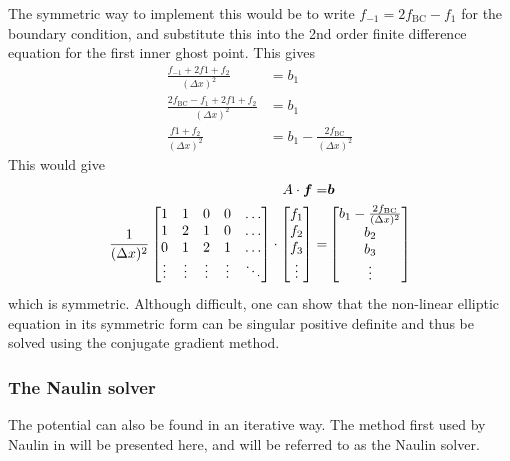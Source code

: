The symmetric way to implement this would be to write $f_{-1}=2f_{\text{BC}}-f_{1}$ for the boundary condition, and substitute this into the 2nd order finite difference equation for the first inner ghost point.
This gives
%
\begin{align*}
    \frac{f_{-1}+2f{1}+f_{2}}{(\Delta x)^2}&=b_1\\
    \frac{2f_{\text{BC}}-f_{1}+2f{1}+f_{2}}{(\Delta x)^2}&=b_1\\
    \frac{f{1}+f_{2}}{(\Delta x)^2}&=b_1 - \frac{2f_{\text{BC}}}{(\Delta x)^2}
\end{align*}
%
This would give
%
\begin{align*}
    A\cdot\boldsymbol{f}=&\boldsymbol{b}\\
    \frac{1}{(\Delta x)^2}
    \begin{bmatrix}
        1                       & 1                       & 0 & 0 & \ldots\\
        1                       & 2                       & 1 & 0 & \ldots\\
        0                       & 1                       & 2 & 1 & \ldots\\
        \vdots                  & \vdots              &\vdots&\vdots&\ddots\\
    \end{bmatrix}
    \cdot
    \begin{bmatrix}
        f_{1}\\
        f_{2}\\
        f_{3}\\
        \vdots
    \end{bmatrix}
    =&
    \begin{bmatrix}
        b_{1} - \frac{2f_{\text{BC}}}{(\Delta x)^2}\\
        b_{2}\\
        b_{3}\\
        \vdots
    \end{bmatrix}
\end{align*}
%
which is symmetric.
Although difficult, one can show that the non-linear elliptic equation in its symmetric form can be singular positive definite and thus be solved using the conjugate gradient method.

\subsubsection{The Naulin solver}
%
The potential can also be found in an iterative way.
The method first used by Naulin in \cite{Naulin2008} will be presented here, and will be referred to as the Naulin solver.

